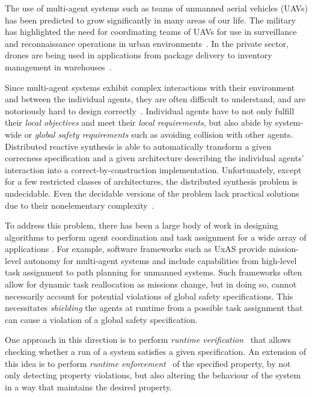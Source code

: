 The use of multi-agent systems such as teams of unmanned aerial vehicles (UAVs) has been predicted to grow significantly in many areas of our life. The military has highlighted the need for coordinating teams of UAVs for use in surveillance and reconnaissance operations in urban environments~\cite{semsch2009autonomous,samad2007network}. In the private sector, drones are being used in applications from package delivery to inventory management in warehouses~\cite{ong2007multi}. 

Since multi-agent systems exhibit complex interactions with their environment and between the individual agents, they are often difficult to understand, and are notoriously hard to design correctly~\cite{Netflix}. Individual agents have to not only fulfill their \emph{local objectives} and meet their \emph{local requirements}, but also abide by system-wide or \emph{global safety requirements} such as avoiding collision with other agents.  Distributed reactive synthesis is able to automatically transform a given correcness specification and a given architecture describing the individual agents' interaction into a correct-by-construction implementation. Unfortunately, except for a few restricted classes of architectures, the distributed synthesis problem is undecidable. Even the decidable versions of the problem lack practical solutions due to their nonelementary complexity~\cite{Schewe08}.  
 
To address this problem, there has been a large body of work in designing algorithms to perform agent coordination and task assignment for a wide array of  applications \cite{bertuccelli2009real,sujit2005multi}. For example, software frameworks such as UxAS \cite{rasmussen2018brief} provide mission-level autonomy for multi-agent systems and include capabilities from high-level task assignment to path planning for unmanned systems. Such frameworks often allow for dynamic task reallocation as missions change, but in doing so, cannot necessarily account for potential violations of global safety specifications. This necessitates \emph{shielding} the agents at runtime from a possible task assignment that can cause a violation of a global safety specification.

One approach in this direction is to perform \emph{runtime verification}~\cite{BauerLS11} that allows checking whether a run of a system
satisfies a given specification.  An extension of this idea is to perform \emph{runtime enforcement}~\cite{Schneider00, Falcone10} of the specified property, by not only detecting property violations, but also altering the behaviour of the system in a way that maintains the desired property.



